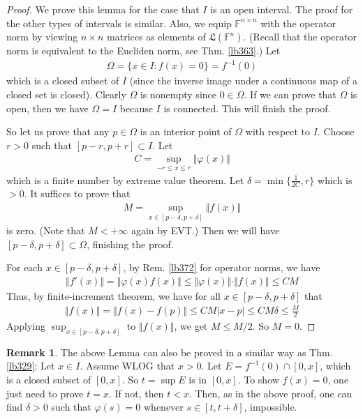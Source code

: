 \documentclass[12pt,b5paper,notitlepage]{article}
\theoremstyle{definition}
\newtheorem{rem}[df]{Remark}
\theoremstyle{plain}
\newcommand{\fk}{\mathfrak}
\newcommand{\Fbb}{\mathbb F}
\numberwithin{equation}{section}
\begin{document}
\begin{proof}
We prove this lemma for the case that $I$ is an open interval. The proof for the other types of intervals is similar. Also, we equip $\Fbb^{n\times n}$ with the operator norm by viewing $n\times n$ matrices as elements of $\fk L(\Fbb^n)$. (Recall that the operator norm is equivalent to the Eucliden norm, see Thm. \ref{lb363}.) Let
\begin{align*}
\Omega=\{x\in I:f(x)=0\}=f^{-1}(0)
\end{align*}
which is a closed subset of $I$ (since the inverse image under a continuous map of a closed set is closed). Clearly $\Omega$ is nonempty since $0\in\Omega$. If we can prove that $\Omega$ is open, then we have $\Omega=I$ because $I$ is connected. This will finish the proof.

So let us prove that any $p\in\Omega$ is an interior point of $\Omega$ with respect to $I$. Choose $r>0$ such that $[p-r,p+r]\subset I$. Let
\begin{align*}
C=\sup_{-r\leq x\leq r}\Vert\varphi(x)\Vert
\end{align*}
which is a finite number by extreme value theorem. Let $\delta=\min\{\frac 1{2C},r\}$ which is $>0$. It suffices to prove that
\begin{align*}
M=\sup_{x\in[p-\delta,p+\delta]}\Vert f(x)\Vert
\end{align*}
is zero. (Note that $M<+\infty$ again by EVT.) Then we will have $[p-\delta,p+\delta]\subset\Omega$, finishing the proof. 

For each $x\in[p-\delta,p+\delta]$, by Rem. \ref{lb372} for operator norms, we have
\begin{align*}
\Vert f'(x)\Vert=\Vert\varphi(x)f(x)\Vert\leq\Vert\varphi(x)\Vert\cdot \Vert f(x)\Vert\leq CM
\end{align*}
Thus, by finite-increment theorem, we have for all $x\in[p-\delta,p+\delta]$ that
\begin{align*}
\Vert f(x)\Vert=\Vert f(x)-f(p)\Vert\leq CM|x-p|\leq CM\delta\leq \frac M2
\end{align*}
Applying $\sup_{x\in[p-\delta,p+\delta]}$ to $\Vert f(x)\Vert$, we get $M\leq M/2$. So $M=0$.
\end{proof}

\begin{rem}
The above Lemma can also be proved in a similar way as Thm. \ref{lb329}: Let $x\in I$. Assume WLOG that $x>0$. Let $E=f^{-1}(0)\cap[0,x]$, which is a closed subset of $[0,x]$. So $t=\sup E$ is in $[0,x]$. To show $f(x)=0$, one just need to prove $t=x$. If not, then $t<x$. Then, as in the above proof, one can find $\delta>0$ such that $\varphi(s)=0$ whenever $s\in[t,t+\delta]$, impossible.
\end{rem}
\end{document}
